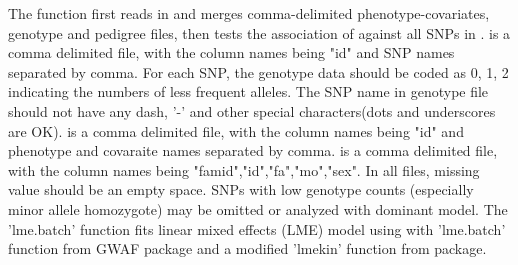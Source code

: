\begin{Details}\relax
The  function first reads in and merges comma-delimited phenotype-covariates, genotype 
and pedigree files, then tests the association of  against all SNPs in .
 is a comma delimited file, with the column names being "id" and SNP names separated by comma.
For each SNP, the genotype data should be coded as 0, 1, 2 indicating the numbers of less frequent 
alleles. The SNP name in genotype file should not have any 
dash, '-' and other special characters(dots and underscores are OK).  is a comma delimited file, with the column names being "id" and phenotype and 
covaraite names separated by comma.  is a comma delimited file, with the column names being 
"famid","id","fa","mo","sex". In all files, missing value should be an empty space. SNPs with low genotype counts (especially minor allele homozygote) may be omitted
or analyzed with dominant model. The 'lme.batch' function fits linear mixed effects (LME) model using  
with 'lme.batch' function from GWAF package and a modified 'lmekin' function from  package.
\end{Details}
